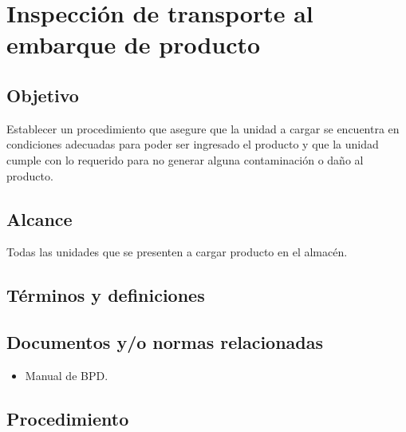 \thispagestyle{formato-PI}
\renewcommand{\MayorVer}{2}
\renewcommand{\MenorVer}{1}
\renewcommand{\Codigo}{PSA-10-PRO} %
\renewcommand{\FechaPub}{2023--01}
\renewcommand{\Titulo}{Inspección de transporte al embarque de producto}

\section{\Titulo}

\subsection{Objetivo}
Establecer un procedimiento que asegure que la unidad a cargar se encuentra en condiciones adecuadas para poder ser ingresado el producto y que la unidad cumple con lo requerido para no generar alguna contaminación o daño al producto.

\subsection{Alcance}
Todas las unidades que se presenten a cargar producto en el almacén.

\subsection{Términos y definiciones}
\begin{description}
\end{description}

\subsection{Documentos y/o normas relacionadas}
	\begin{itemize}
		\item Manual de \gls{BPD}.
	\end{itemize}

\subsection{Procedimiento}

